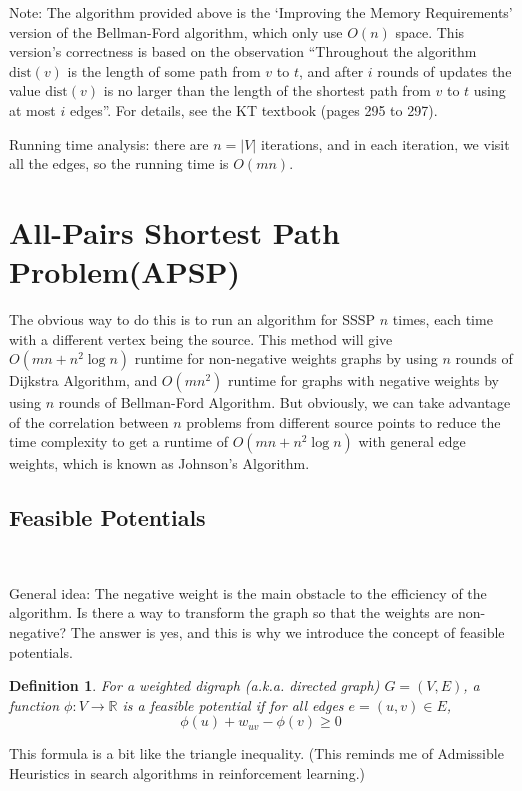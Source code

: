 \documentclass[11pt]{article}
\theoremstyle{plain}
\newtheorem{definition}{Definition}[section]
\begin{document}
  Note: The algorithm provided above is the `Improving the Memory Requirements' version of the Bellman-Ford algorithm, 
  which only use $O(n)$ space. This version's correctness is based on the observation ``Throughout the algorithm $\text{dist}(v)$ 
  is the length of some path from $v$ to $t$, and after $i$ rounds of updates the value $\text{dist}(v)$ is no larger than the length of
  the shortest path from $v$ to $t$ using at most $i$ edges''. For details, see the KT textbook (pages 295 to 297).

  Running time analysis: there are $n = |V|$ iterations, and in each iteration, we visit all the edges, so the running time is $O(mn)$.

\section{All-Pairs Shortest Path Problem(APSP)}

  The obvious way to do this is to run an algorithm for SSSP $n$ times,
  each time with a different vertex being the source. This method will give $O(mn + n^{2} \log n)$
  runtime for non-negative weights graphs by using $n$ rounds of Dijkstra Algorithm, and $O(mn^{2})$ 
  runtime for graphs with negative weights by using $n$ rounds of Bellman-Ford Algorithm. But obviously, 
  we can take advantage of the correlation between $n$ problems from different source points to reduce 
  the time complexity to get a runtime of $O(mn + n^{2} \log n)$ with general edge weights, which is 
  known as Johnson's Algorithm.

\subsection{Feasible Potentials}\

  General idea: The negative weight is the main obstacle to the efficiency of the algorithm. Is there a way to
  transform the graph so that the weights are non-negative? The answer is yes, and this is why we introduce the
  concept of feasible potentials.

  \begin{definition}
    For a weighted digraph (a.k.a. directed graph) $G = (V, E)$, a function $\phi: V \rightarrow \mathbb{R}$ is
    a feasible potential if for all edges $e=(u, v) \in E$, 
    \[
      \phi(u) + w_{uv} - \phi(v) \geq 0
    \]
  \end{definition}

  This formula is a bit like the triangle inequality. (This reminds me of Admissible Heuristics in search algorithms 
  in reinforcement learning.) 
\end{document}
